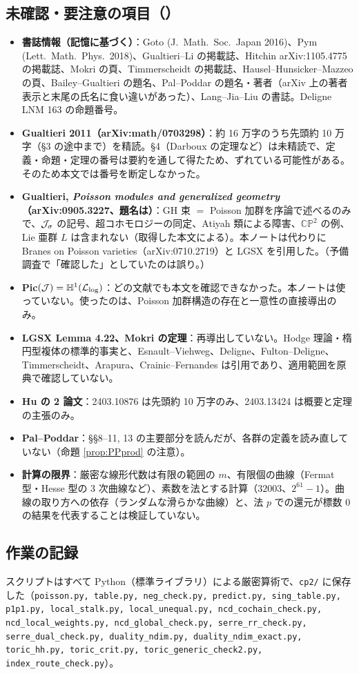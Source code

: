 \subsection{未確認・要注意の項目（\tQ）}
\begin{itemize}
\item \textbf{書誌情報（記憶に基づく）}：Goto (J.\ Math.\ Soc.\ Japan 2016)、Pym (Lett.\ Math.\ Phys.\ 2018)、Gualtieri--Li の掲載誌、Hitchin arXiv:1105.4775 の掲載誌、Mokri の頁、Timmerscheidt の掲載誌、Hausel--Hunsicker--Mazzeo の頁、Bailey--Gualtieri の題名、Pal--Poddar の題名・著者（arXiv 上の著者表示と末尾の氏名に食い違いがあった）、Lang--Jia--Liu の書誌。Deligne LNM 163 の命題番号。
\item \textbf{Gualtieri 2011（arXiv:math/0703298）}：約 16 万字のうち先頭約 10 万字（\S3 の途中まで）を精読。\S4（Darboux の定理など）は未精読で、定義・命題・定理の番号は要約を通して得たため、ずれている可能性がある。そのため本文では番号を断定しなかった。
\item \textbf{Gualtieri, \emph{Poisson modules and generalized geometry}（arXiv:0905.3227、題名は\tQ）}：GH 束 $=$ Poisson 加群を序論で述べるのみで、$\mathcal J_\sigma$ の記号、超コホモロジーの同定、Atiyah 類による障害、$\mathbb{CP}^2$ の例、Lie 亜群 $L$ は含まれない（取得した本文による）。本ノートは代わりに Branes on Poisson varieties（arXiv:0710.2719）と LGSX を引用した。（予備調査で「確認した」としていたのは誤り。）
\item \textbf{Pic$(\mathcal J)=\mathbb H^1(\mathcal L_{\log})$}：どの文献でも本文を確認できなかった。本ノートは使っていない。使ったのは、Poisson 加群構造の存在と一意性の直接導出のみ。
\item \textbf{LGSX Lemma 4.22、Mokri の定理}：再導出していない。Hodge 理論・楕円型複体の標準的事実と、Esnault--Viehweg、Deligne、Fulton--Deligne、Timmerscheidt、Arapura、Crainic--Fernandes は引用であり、適用範囲を原典で確認していない。
\item \textbf{Hu の 2 論文}：2403.10876 は先頭約 10 万字のみ、2403.13424 は概要と定理の主張のみ。
\item \textbf{Pal--Poddar}：\S\S8--11, 13 の主要部分を読んだが、各群の定義を読み直していない（命題 \ref{prop:PPprod} の注意）。
\item \textbf{計算の限界}：厳密な線形代数は有限の範囲の $m$、有限個の曲線（Fermat 型・Hesse 型の 3 次曲線など）、素数を法とする計算（$32003$、$2^{61}-1$）。曲線の取り方への依存（ランダムな滑らかな曲線）と、法 $p$ での還元が標数 0 の結果を代表することは検証していない。
\end{itemize}

\subsection{作業の記録}
スクリプトはすべて Python（標準ライブラリ）による厳密算術で、\texttt{cp2/} に保存した（\texttt{poisson.py, table.py, neg\_check.py, predict.py, sing\_table.py, p1p1.py, local\_stalk.py, local\_unequal.py, ncd\_cochain\_check.py, ncd\_local\_weights.py, ncd\_global\_check.py, serre\_rr\_check.py, serre\_dual\_check.py, duality\_ndim.py, duality\_ndim\_exact.py, toric\_hh.py, toric\_crit.py, toric\_generic\_check2.py, index\_route\_check.py}）。
